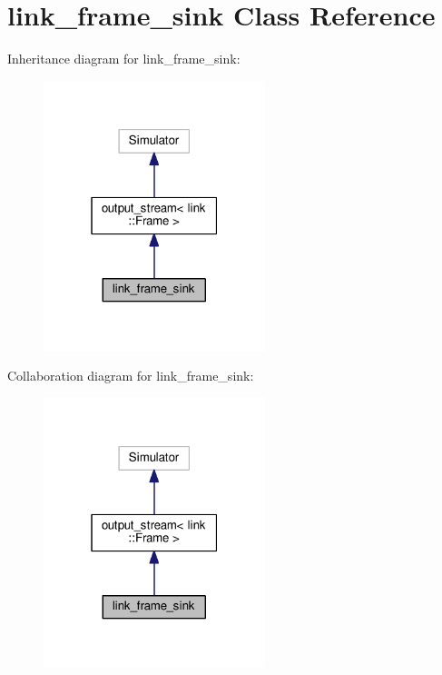 \hypertarget{classlink__frame__sink}{}\section{link\+\_\+frame\+\_\+sink Class Reference}
\label{classlink__frame__sink}


Inheritance diagram for link\+\_\+frame\+\_\+sink\+:\nopagebreak
\begin{figure}[H]
\begin{center}
\leavevmode
\includegraphics[width=183pt]{classlink__frame__sink__inherit__graph}
\end{center}
\end{figure}


Collaboration diagram for link\+\_\+frame\+\_\+sink\+:\nopagebreak
\begin{figure}[H]
\begin{center}
\leavevmode
\includegraphics[width=183pt]{classlink__frame__sink__coll__graph}
\end{center}
\end{figure}
